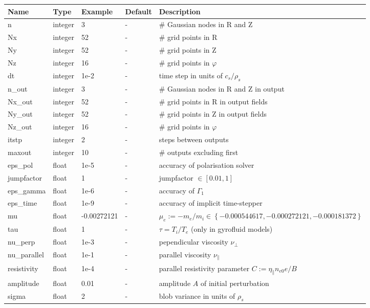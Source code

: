 \documentclass{hitec} %
\begin{document}
\begin{longtable}{llll>{\RaggedRight}p{7cm}}
\toprule
\rowcolor{gray!50}\textbf{Name} &  \textbf{Type} & \textbf{Example} & \textbf{Default} & \textbf{Description}  \\ \midrule
n      & integer & 3 & - &\# Gaussian nodes in R and Z \\
Nx     & integer &52& - &\# grid points in R \\
Ny     & integer &52& - &\# grid points in Z \\
Nz     & integer &16& - &\# grid points in $\varphi$ \\
dt     & integer &1e-2& - &time step in units of $c_s/\rho_s$ \\
n\_out  & integer &3  & - &\# Gaussian nodes in R and Z in output \\
Nx\_out & integer &52& - &\# grid points in R in output fields \\
Ny\_out & integer &52& - &\# grid points in Z in output fields \\
Nz\_out & integer &16& - &\# grid points in $\varphi$ \\
itstp  & integer &2  & - &   steps between outputs \\
maxout & integer &10& - &      \# outputs excluding first \\
eps\_pol   & float &1e-5    & - &  accuracy of polarisation solver \\
jumpfactor & float &1& - &     jumpfactor $\in \left[0.01,1\right]$\\
eps\_gamma & float &1e-6    & - & accuracy of $\Gamma_1$  \\
eps\_time  & float &1e-9   & - & accuracy of implicit time-stepper \\
mu         & float & -0.00272121& - & $\mu_e :=-m_e/m_i \in \left\{ -0.000544617, -0.000272121, -0.000181372 \right\}$\\
tau        & float &1      & - & $\tau = T_i/T_e$ (only in gyrofluid models) \\
nu\_perp   & float &1e-3   & - & pependicular viscosity $\nu_\perp$ \\
nu\_parallel & float &1e-1 & - & parallel viscosity $\nu_\parallel$ \\
resistivity & float &1e-4  & - & parallel resistivity parameter $C:= \eta_\parallel n_{e0} e/B $ \\
amplitude  & float &0.01   & - & amplitude $A$ of initial perturbation \\
sigma      & float &2      & - & blob variance in units of $\rho_s$ \\

\end{longtable}
\end{document}
